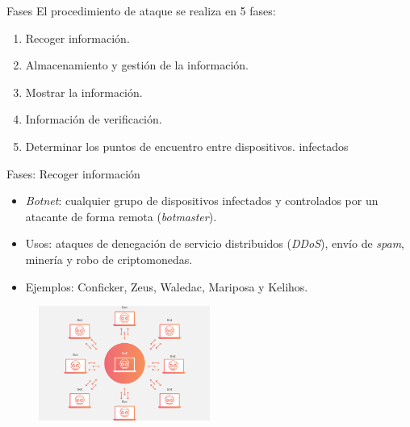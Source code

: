 \documentclass[aspectratio=43]{beamer}
\begin{document}
\begin{frame}{Fases}
  El procedimiento de ataque se realiza en 5 fases:   
  \begin{enumerate}
  \item Recoger información.
  \item Almacenamiento y gestión de la información.
  \item Mostrar la información.
  \item Información de verificación.
  \item Determinar los puntos de encuentro entre dispositivos. infectados
  \end{enumerate}  
\end{frame}




\begin{frame}{Fases: Recoger información}
  
  \begin{itemize}
  \item \emph{Botnet}: cualquier grupo de dispositivos infectados y controlados por un atacante de forma remota (\emph{botmaster}).  
  
  \item Usos: ataques de denegación de servicio distribuidos (\emph{DDoS}), envío de \emph{spam}, minería y robo de criptomonedas.  

 \item Ejemplos: Conficker, Zeus, Waledac, Mariposa y Kelihos. 
 
  \end{itemize}
  
  
\begin{figure}[htbp] 	
   \includegraphics[width=0.50\textwidth]{figuras/botnet}  
  \label{botnet}

\end{figure}

\end{frame}
\end{document}
